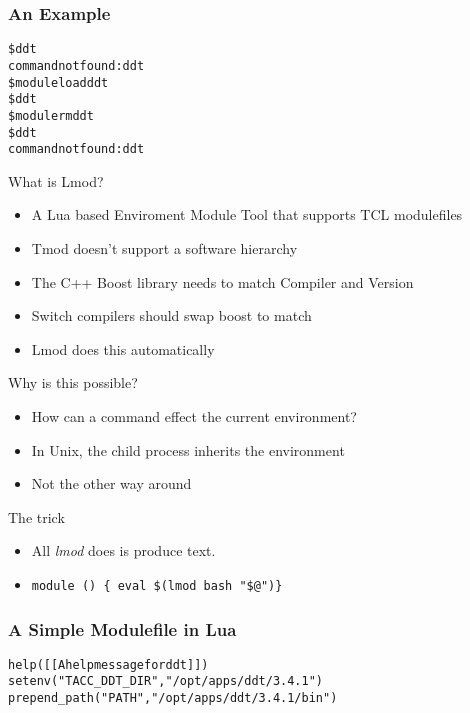 \documentclass{beamer}
\begin{document}
\begin{frame}[fragile]
    \frametitle{An Example}
    {\small
      \begin{alltt}
          \$ {\color{blue} ddt}
          command not found: ddt
          \$ {\color{blue} module load ddt}
          \$ {\color{blue} ddt }
          \$ {\color{blue} module rm ddt}
          \$ {\color{blue} ddt}
          command not found: ddt
      \end{alltt}
    }
\end{frame}    

\begin{frame}{What is Lmod?}
  \begin{itemize}
    \item A Lua based Enviroment Module Tool that supports TCL modulefiles
    \item Tmod doesn't support a software hierarchy
    \item The C++ Boost library needs to match Compiler and Version
    \item Switch compilers should swap boost to match
    \item Lmod does this automatically
  \end{itemize}
\end{frame}

\begin{frame}{Why is this possible?}
  \begin{itemize}
    \item How can a command effect the current environment?
    \item In Unix, the child process inherits the environment
    \item Not the other way around
  \end{itemize}
\end{frame}

\begin{frame}{The trick}
  \begin{itemize}
    \item All \emph{lmod} does is produce text.
    \item \texttt{module () \{ eval \$(lmod bash "\$@")\}}
  \end{itemize}
\end{frame}


\begin{frame}[fragile]
    \frametitle{A Simple Modulefile in Lua}
    {\small
      \begin{alltt}
          help([[A help message for ddt]])
          setenv("TACC_DDT_DIR", "/opt/apps/ddt/3.4.1")
          prepend_path("PATH",   "/opt/apps/ddt/3.4.1/bin")
      \end{alltt}
    }
\end{frame}    
\end{document}
